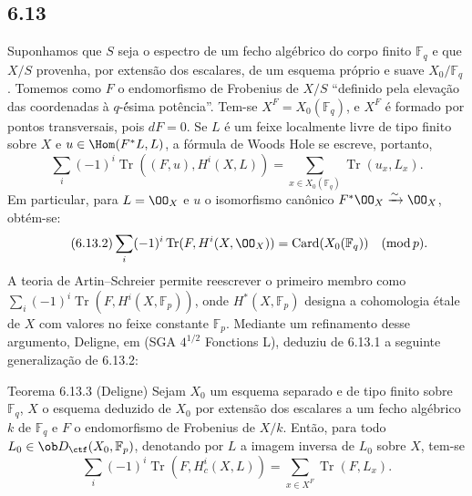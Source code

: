 \subsection*{6.13}
Suponhamos que $S$ seja o espectro de um fecho algébrico do corpo finito $\mathbb F_q$ e que $X/S$ provenha, por extensão dos escalares, de um esquema próprio e suave $X_0/\mathbb F_q$. Tomemos como $F$ o endomorfismo de Frobenius de $X/S$ ``definido pela elevação das coordenadas à $q$-\'ésima potência''. Tem-se $X^F=X_0(\mathbb F_q)$, e $X^F$ é formado por pontos transversais, pois $dF=0$. Se $L$ é um feixe localmente livre de tipo finito sobre $X$ e $u\in\Hom(F^*L,L)$, a fórmula de Woods Hole se escreve, portanto,
\begin{equation}
\tag{6.13.1}
\sum_i(-1)^i\operatorname{Tr}((F,u),H^i(X,L))=
\sum_{x\in X_0(\mathbb F_q)}\operatorname{Tr}(u_x,L_x).
\end{equation}
Em particular, para $L=\OO_X$ e $u$ o isomorfismo canônico $F^*\OO_X\xrightarrow{\sim}\OO_X$, obtém-se:
\begin{equation}
\tag{6.13.2}
\sum_i(-1)^i\operatorname{Tr}(F,H^i(X,\OO_X))=\operatorname{Card}(X_0(\mathbb F_q))\quad(\operatorname{mod} p).
\end{equation}
A teoria de Artin--Schreier permite reescrever o primeiro membro como $\sum_i(-1)^i\operatorname{Tr}(F,H^i(X,\mathbb F_p))$, onde $H^*(X,\mathbb F_p)$ designa a cohomologia étale de $X$ com valores no feixe constante $\mathbb F_p$. Mediante um refinamento desse argumento, Deligne, em (SGA $4^{1/2}$ Fonctions L), deduziu de 6.13.1 a seguinte generalização de 6.13.2:


\begin{statement}{Teorema 6.13.3 (Deligne)}
Sejam $X_0$ um esquema separado e de tipo finito sobre $\mathbb F_q$, $X$ o esquema deduzido de $X_0$ por extensão dos escalares a um fecho algébrico $k$ de $\mathbb F_q$ e $F$ o endomorfismo de Frobenius de $X/k$. Então, para todo $L_0\in\ob D_{\ctf}(X_0,\mathbb F_p)$, denotando por $L$ a imagem inversa de $L_0$ sobre $X$, tem-se
\[
\sum_i(-1)^i\operatorname{Tr}(F,H_c^i(X,L))=
\sum_{x\in X^F}\operatorname{Tr}(F,L_x).
\]
\end{statement}


